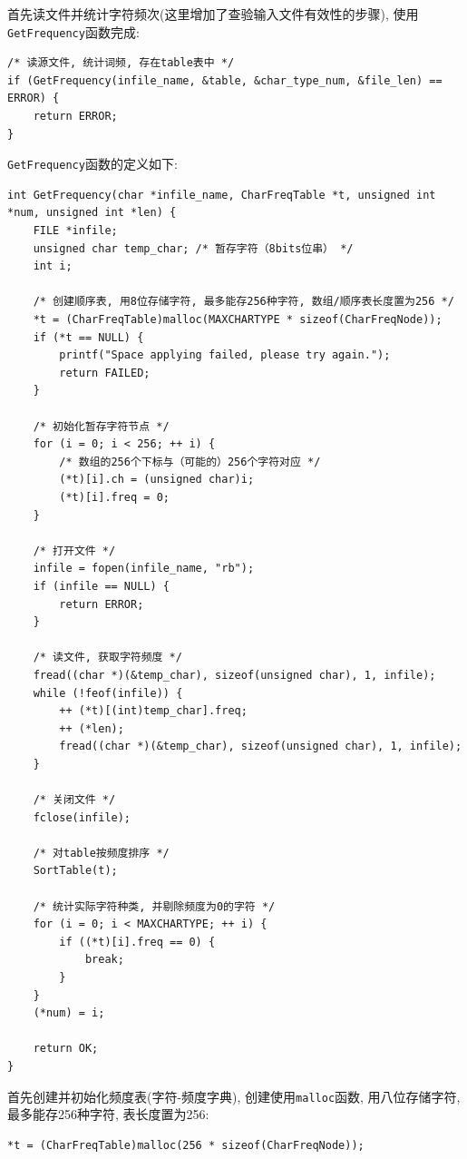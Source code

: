 \documentclass{ctexart}
\begin{document}
首先读文件并统计字符频次(这里增加了查验输入文件有效性的步骤), 使用\texttt{GetFrequency}函数完成:

{\setmainfont{Courier New Bold}              
\begin{lstlisting}
/* 读源文件, 统计词频, 存在table表中 */
if (GetFrequency(infile_name, &table, &char_type_num, &file_len) == ERROR) {
    return ERROR;
}
\end{lstlisting}}

\texttt{GetFrequency}函数的定义如下:

{\setmainfont{Courier New Bold}              
\begin{lstlisting}
int GetFrequency(char *infile_name, CharFreqTable *t, unsigned int *num, unsigned int *len) {
    FILE *infile;
    unsigned char temp_char; /* 暂存字符（8bits位串） */
    int i;

    /* 创建顺序表, 用8位存储字符, 最多能存256种字符, 数组/顺序表长度置为256 */
    *t = (CharFreqTable)malloc(MAXCHARTYPE * sizeof(CharFreqNode));
    if (*t == NULL) {
        printf("Space applying failed, please try again.");
        return FAILED;
    }

    /* 初始化暂存字符节点 */
    for (i = 0; i < 256; ++ i) {
        /* 数组的256个下标与（可能的）256个字符对应 */
        (*t)[i].ch = (unsigned char)i;
        (*t)[i].freq = 0;
    }

    /* 打开文件 */
    infile = fopen(infile_name, "rb");
    if (infile == NULL) {
        return ERROR;
    }

    /* 读文件, 获取字符频度 */
    fread((char *)(&temp_char), sizeof(unsigned char), 1, infile);
    while (!feof(infile)) {
        ++ (*t)[(int)temp_char].freq;
        ++ (*len);
        fread((char *)(&temp_char), sizeof(unsigned char), 1, infile);
    }

    /* 关闭文件 */
    fclose(infile);

    /* 对table按频度排序 */
    SortTable(t);

    /* 统计实际字符种类, 并剔除频度为0的字符 */
    for (i = 0; i < MAXCHARTYPE; ++ i) {
        if ((*t)[i].freq == 0) {
            break;
        }
    }
    (*num) = i;

    return OK;
}
\end{lstlisting}}

首先创建并初始化频度表(字符-频度字典), 创建使用\texttt{malloc}函数, 用八位存储字符, 最多能存256种字符, 表长度置为256:

{\setmainfont{Courier New Bold}              
\begin{lstlisting}
*t = (CharFreqTable)malloc(256 * sizeof(CharFreqNode));
\end{lstlisting}}
\end{document}
